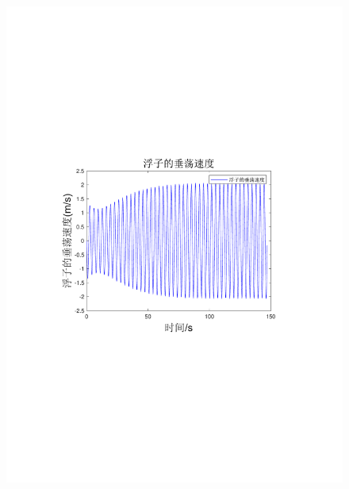 \documentclass[12pt,utf8]{article}
\begin{document}
\begin{figure}[htbp]
\begin{minipage}{0.45\linewidth}
		\includegraphics[width=0.9\linewidth]{figures/浮子的垂荡速度.pdf}
	\end{minipage}
	\begin{minipage}{0.45\linewidth}

\end{minipage}
\end{figure}
\end{document}
